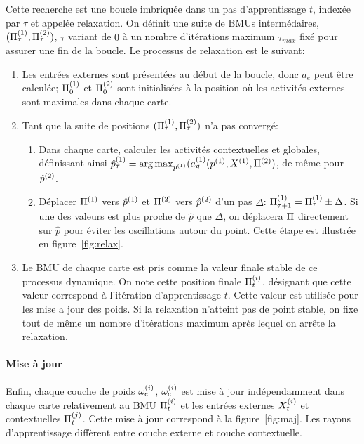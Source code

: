 Cette recherche est une boucle imbriquée dans un pas d'apprentissage $t$, indexée par $\tau$ et appelée relaxation. On définit une suite de BMUs intermédaires, $(\Pi^{({1})}_\tau , \Pi^{({2})}_\tau)$, $\tau$ variant de $0$ à un nombre d'itérations maximum $\tau_{max}$ fixé pour assurer une fin de la boucle. Le processus de relaxation est le suivant:
\begin{enumerate}
\item Les entrées externes sont présentées au début de la boucle, donc $a_e$ peut être calculée; $\Pi^{({1})}_0$ et $\Pi^{({2})}_0$ sont initialisées à la position où les activités externes sont maximales dans chaque carte. 
\item Tant que la suite de positions $(\Pi^{({1})}_\tau,\Pi^{({2})}_\tau)$ n'a pas convergé:
	\begin{enumerate}
	\item Dans chaque carte, calculer les activités contextuelles et globales, définissant ainsi $\hat{p}^{({1})}_\tau = \operatorname*{arg\,max}_{p^{({1})}}(a_g^{({1})}(p^{({1})},X^{({1})}, \Pi^{({2})})$, de même pour $\hat{p}^{({2})}$.
	\item Déplacer $\Pi^{({1})}$ vers $\hat{p}^{({1})}$ et $\Pi^{({2})}$ vers $\hat{p}^{({2})}$ d'un pas $\Delta$: $\Pi^{({1})}_{\tau+1} = \Pi^{({1})}_{\tau} \pm \Delta$.
	Si une des valeurs est plus proche de $\hat{p}$ que $\Delta$, on déplacera $\Pi$ directement sur $\hat{p}$ pour éviter les oscillations autour du point. Cette étape est illustrée en figure~\ref{fig:relax}.
	\end{enumerate}
\item Le BMU de chaque carte est pris comme la valeur finale stable de ce processus dynamique. On note cette position finale $\Pi^{({i})}_t$, désignant que cette valeur correspond à l'itération d'apprentissage $t$. Cette valeur est utilisée pour les mise a jour des poids. Si la relaxation n'atteint pas de point stable, on fixe tout de même un nombre d'itérations maximum après lequel on arrête la relaxation.
\end{enumerate}
\paragraph{Mise à jour}
Enfin, chaque couche de poids $\omega_{e}^{({i})}$, $\omega_c^{({i})}$ est mise à jour indépendamment dans chaque carte relativement au BMU $\Pi^{({i})}_t$ et les entrées externes $X^{({i})}_t$ et contextuelles $\Pi^{({j})}_t$. Cette mise à jour correspond à la figure~\ref{fig:maj}. Les rayons d'apprentissage diffèrent entre couche externe et couche contextuelle.


